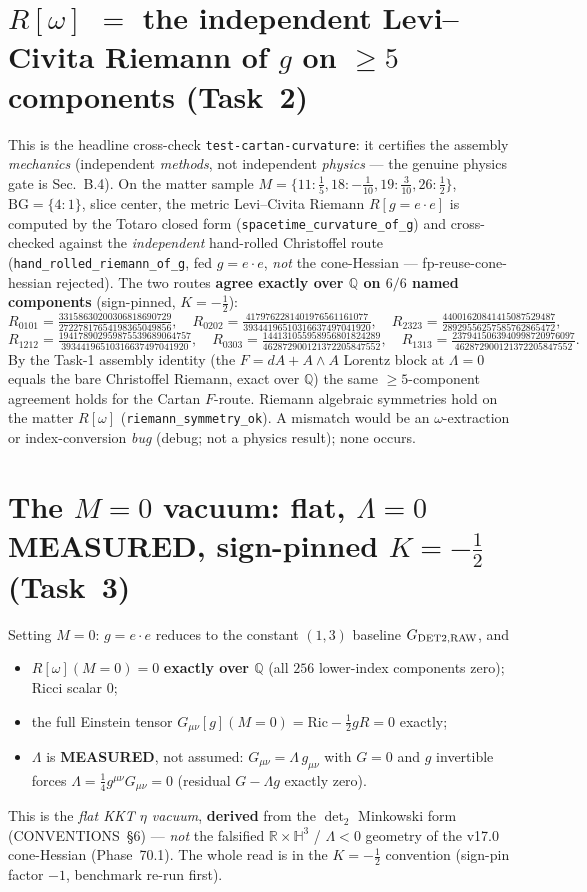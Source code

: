 \documentclass[11pt]{article}
\newcommand{\R}{\mathbb{R}}
\newcommand{\Q}{\mathbb{Q}}
\newcommand{\eu}{e}
\newcommand{\om}{\omega}
\theoremstyle{definition}\newtheorem{remark}{Remark}
\theoremstyle{plain}\newtheorem{proposition}{Proposition}
\begin{document}
\section{$R[\om]$ $=$ the independent Levi--Civita Riemann of $g$ on $\geq5$ components (Task~2)}
This is the headline cross-check \texttt{test-cartan-curvature}: it certifies the assembly
\emph{mechanics} (independent \emph{methods}, not independent \emph{physics} --- the genuine physics
gate is Sec.~B.4). On the matter sample $M=\{11{:}\tfrac15,18{:}{-}\tfrac1{10},19{:}\tfrac3{10},
26{:}\tfrac12\}$, $\mathrm{BG}=\{4{:}1\}$, slice center, the metric Levi--Civita Riemann $R[g{=}\eu\cdot\eu]$
is computed by the Totaro closed form (\texttt{spacetime\_curvature\_of\_g}) and cross-checked against the
\emph{independent} hand-rolled Christoffel route (\texttt{hand\_rolled\_riemann\_of\_g}, fed $g=\eu\cdot\eu$,
\emph{not} the cone-Hessian --- fp-reuse-cone-hessian rejected). The two routes \textbf{agree exactly over
$\Q$ on $6/6$ named components} (sign-pinned, $K=-\tfrac12$):
\[
  R_{0101}=\tfrac{33158630200306818690729}{27227817654198365049856},\quad
  R_{0202}=\tfrac{4179762281401976561161077}{39344196510316637497041920},\quad
  R_{2323}=\tfrac{44001620841415087529487}{28929556257585762865472},
\]
\[
  R_{1212}=\tfrac{194178902959875539689064757}{39344196510316637497041920},\quad
  R_{0303}=\tfrac{144131055958956801824289}{462872900121372205847552},\quad
  R_{1313}=\tfrac{2379415063940998720976097}{462872900121372205847552}.
\]
By the Task-1 assembly identity (the $F=dA+A\wedge A$ Lorentz block at $\Lambda=0$ equals the bare
Christoffel Riemann, exact over $\Q$) the same $\geq5$-component agreement holds for the Cartan $F$-route.
Riemann algebraic symmetries hold on the matter $R[\om]$ (\texttt{riemann\_symmetry\_ok}). A mismatch would
be an $\om$-extraction or index-conversion \emph{bug} (debug; not a physics result); none occurs.

\section{The $M=0$ vacuum: flat, $\Lambda=0$ MEASURED, sign-pinned $K=-\tfrac12$ (Task~3)}
Setting $M=0$: $g=\eu\cdot\eu$ reduces to the constant $(1,3)$ baseline $G_{\rm DET2,RAW}$, and
\begin{itemize}
\item $R[\om](M{=}0)=0$ \textbf{exactly over $\Q$} (all $256$ lower-index components zero); Ricci scalar $0$;
\item the full Einstein tensor $G_{\mu\nu}[g](M{=}0)=\mathrm{Ric}-\tfrac12 g R=0$ exactly;
\item $\Lambda$ is \textbf{MEASURED}, not assumed: $G_{\mu\nu}=\Lambda\,g_{\mu\nu}$ with $G=0$ and $g$
invertible forces $\Lambda=\tfrac14 g^{\mu\nu}G_{\mu\nu}=0$ (residual $G-\Lambda g$ exactly zero).
\end{itemize}
This is the \emph{flat KKT $\eta$ vacuum}, \textbf{derived} from the $\det_2$ Minkowski form
(CONVENTIONS~\S6) --- \emph{not} the falsified $\R\times\mathbb{H}^3$ / $\Lambda<0$ geometry of the v17.0
cone-Hessian (Phase~70.1). The whole read is in the $K=-\tfrac12$ convention (sign-pin factor $-1$,
benchmark re-run first).
\end{document}

